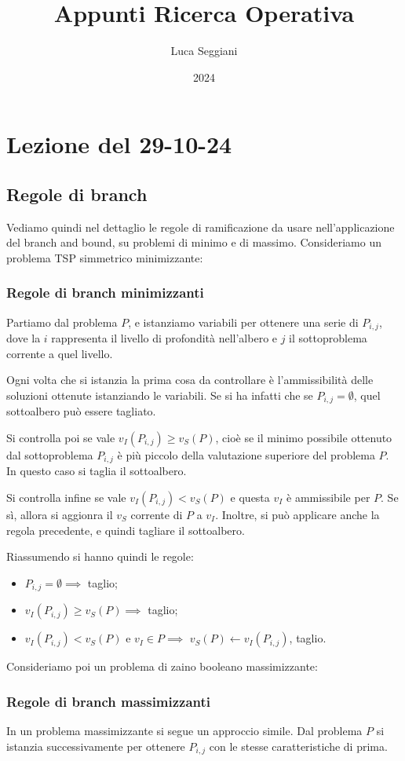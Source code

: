 \documentclass[a4paper,11pt]{article}
\title{Appunti Ricerca Operativa}
\author{Luca Seggiani}
\date{2024}
\begin{document}
\section{Lezione del 29-10-24}

\thispagestyle{empty}
\pagestyle{fancy}

\subsection{Regole di branch}
Vediamo quindi nel dettaglio le regole di ramificazione da usare nell'applicazione del branch and bound, su problemi di minimo e di massimo.
Consideriamo un problema TSP simmetrico minimizzante:
\subsubsection{Regole di branch minimizzanti}
Partiamo dal problema $P$, e istanziamo variabili per ottenere una serie di $P_{i,j}$, dove la $i$ rappresenta il livello di profondità nell'albero e $j$ il sottoproblema corrente a quel livello.

Ogni volta che si istanzia la prima cosa da controllare è l'ammissibilità delle soluzioni ottenute istanziando le variabili.
Se si ha infatti che se $P_{i,j} = \emptyset$, quel sottoalbero può essere tagliato.

Si controlla poi se vale $v_I(P_{i,j}) \geq v_S(P)$, cioè se il minimo possibile ottenuto dal sottoproblema $P_{i,j}$ è più piccolo della valutazione superiore del problema $P$. In questo caso si taglia il sottoalbero.

Si controlla infine se vale $v_I(P_{i,j}) < v_S(P)$ e questa $v_I$ è ammissibile per $P$. Se sì, allora si aggionra il $v_S$ corrente di $P$ a $v_I$.
Inoltre, si può applicare anche la regola precedente, e quindi tagliare il sottoalbero.

Riassumendo si hanno quindi le regole:
\begin{itemize}
	\item $P_{i,j} = \emptyset \implies $ taglio;
	\item $v_I(P_{i,j}) \geq v_S(P) \implies $ taglio;
	\item $v_I(P_{i,j}) < v_S(P)$ e $v_I \in P \implies $ $v_S(P) \leftarrow v_I(P_{i,j})$, taglio.
\end{itemize}

\par\smallskip 
Consideriamo poi un problema di zaino booleano massimizzante:
\subsubsection{Regole di branch massimizzanti}
In un problema massimizzante si segue un approccio simile.
Dal problema $P$ si istanzia successivamente per ottenere $P_{i,j}$ con le stesse caratteristiche di prima.
\end{document}

